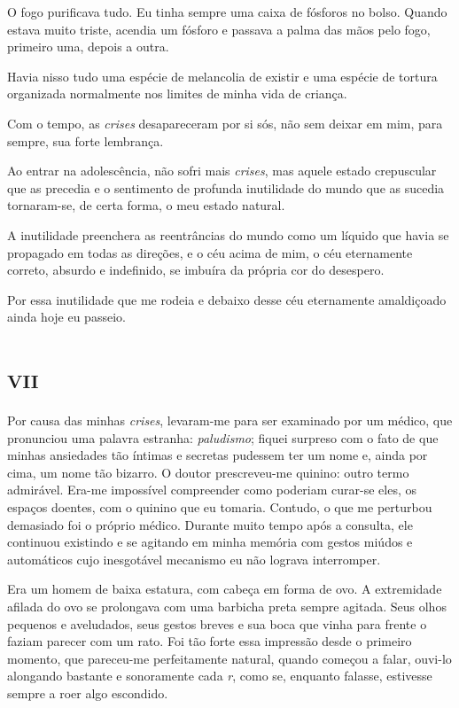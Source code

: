 O fogo purificava tudo. Eu tinha sempre uma caixa de fósforos no bolso. Quando estava muito triste, acendia um fósforo e passava a palma das mãos pelo fogo, primeiro uma, depois a outra.

Havia nisso tudo uma espécie de melancolia de existir e uma espécie de tortura organizada normalmente nos limites de minha vida de criança.

Com o tempo, as \textit{crises} desapareceram por si sós, não sem deixar em mim, para sempre, sua forte lembrança.

Ao entrar na adolescência, não sofri mais \textit{crises}, mas aquele estado crepuscular que as precedia e o sentimento de profunda inutilidade do mundo que as sucedia tornaram-se, de certa forma, o meu estado natural.

A inutilidade preenchera as reentrâncias do mundo como um líquido que havia se propagado em todas as direções, e o céu acima de mim, o céu eternamente correto, absurdo e indefinido, se imbuíra da própria cor do desespero. 

Por essa inutilidade que me rodeia e debaixo desse céu eternamente amaldiçoado ainda hoje eu passeio.


\chapter*{\huge\centering\textsc{vii}}

Por causa das minhas \textit{crises}, levaram-me para ser examinado por um médico, que pronunciou uma palavra estranha: \textit{paludismo}; fiquei surpreso com o fato de que minhas ansiedades tão íntimas e secretas pudessem ter um nome e, ainda por cima, um nome tão bizarro. O doutor prescreveu-me quinino: outro termo admirável. Era-me impossível compreender como poderiam curar-se eles, os espaços doentes, com o quinino que eu tomaria. Contudo, o que me perturbou demasiado foi o próprio médico. Durante muito tempo após a consulta, ele continuou existindo e se agitando em minha memória com gestos miúdos e automáticos cujo inesgotável mecanismo eu não lograva interromper.

Era um homem de baixa estatura, com cabeça em forma de ovo. A extremidade afilada do ovo se prolongava com uma barbicha preta sempre agitada. Seus olhos pequenos e aveludados, seus gestos breves e sua boca que vinha para frente o faziam parecer com um rato. Foi tão forte essa impressão desde o primeiro momento, que pareceu-me perfeitamente natural, quando começou a falar, ouvi-lo alongando bastante e sonoramente cada \textit{r}, como se, enquanto falasse, estivesse sempre a roer algo escondido.

